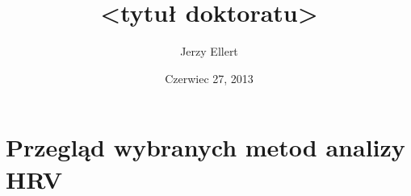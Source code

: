 \documentclass[final]{report}   %
\begin{document}


\title{<tytuł doktoratu>}
\author{Jerzy Ellert}
\date{Czerwiec 27, 2013}
\maketitle





\chapter{Przegląd wybranych metod analizy HRV}








\end{document}

